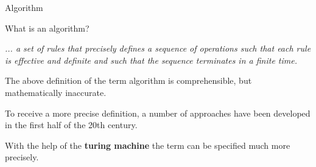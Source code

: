 \begin{vbframe}{Algorithm}
\framebreak

What is an algorithm?

\lz

\emph{... a set of rules that precisely defines a sequence of operations such that each rule is effective and definite and such that the sequence terminates in a finite time.} \\

\lz




The above definition of the term algorithm is comprehensible, but mathematically inaccurate.

\lz

To receive a more precise definition, a number of approaches have been developed in the first half of the 20th century.

\lz

With the help of the \textbf{turing machine} the term can be specified much more precisely.

\end{vbframe}

